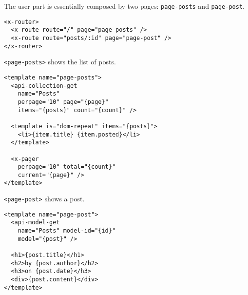 The user part is essentially composed by two pages: \texttt{page-posts} and \texttt{page-post}.

\begin{lstlisting}[language=HTML5]
<x-router>
  <x-route route="/" page="page-posts" />
  <x-route route="posts/:id" page="page-post" />
</x-router>
\end{lstlisting}

\texttt{<page-posts>} shows the list of posts.

\begin{lstlisting}[language=HTML5]
<template name="page-posts">
  <api-collection-get 
    name="Posts"
    perpage="10" page="{page}" 
    items="{posts}" count="{count}" />

  <template is="dom-repeat" items="{posts}">
    <li>{item.title} {item.posted}</li>
  </template>

  <x-pager 
    perpage="10" total="{count}" 
    current="{page}" />
</template>
\end{lstlisting}

\texttt{<page-post>} shows a post. 

\begin{lstlisting}[language=HTML5]
<template name="page-post">
  <api-model-get 
    name="Posts" model-id="{id}" 
    model="{post}" />

  <h1>{post.title}</h1>
  <h2>by {post.author}</h2>
  <h3>on {post.date}</h3>
  <div>{post.content}</div>
</template>
\end{lstlisting}


